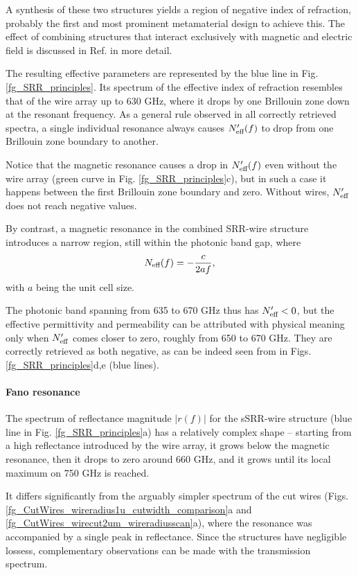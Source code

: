 A synthesis of these two structures yields a region of negative index of refraction, probably the first \cite{pendry2000negative} and most prominent metamaterial design to achieve this. The effect of combining structures that interact exclusively with magnetic and electric field is discussed in Ref. \cite{koschny2004effective} in more detail.

The resulting effective parameters are represented by the blue line in Fig. \ref{fg_SRR_principles}. Its spectrum of the effective index of refraction resembles that of the wire array up to 630 GHz, where it drops by one Brillouin zone down at the resonant frequency.
As a general rule observed in all correctly retrieved spectra, a single individual resonance always causes $N_{\text{eff} }'(f)$ to drop from one Brillouin zone boundary to another. 

Notice that the magnetic resonance causes a drop in $N_{\text{eff} }'(f)$ even without the wire array (green curve in Fig. \ref{fg_SRR_principles}c), but in such a case it happens between the first Brillouin zone boundary and zero. Without wires, $N_{\text{eff} }'$ does not reach negative values.

By contrast, a magnetic resonance in the combined SRR-wire structure introduces a narrow region, still within the photonic band gap, where 
\begin{equation} N_{\text{eff} }(f) = -\frac{c}{2 a f}, \label{eq_BZN2}\end{equation}
with $a$ being the unit cell size.	

The photonic band spanning from 635 to 670 GHz thus has $N_{\text{eff} }'<0$, but the effective permittivity and permeability can be attributed with physical meaning only when $N_{\text{eff} }'$ comes closer to zero, roughly from 650 to 670 GHz. They are correctly retrieved as both negative, as can be indeed seen from in Figs. \ref{fg_SRR_principles}d,e (blue lines).

\paragraph{Fano resonance} %
The spectrum of reflectance magnitude $|r(f)|$ for the sSRR-wire structure (blue line in Fig. \ref{fg_SRR_principles}a) has a relatively complex shape -- starting from a high reflectance introduced by the wire array, it grows below the magnetic resonance, then it drops to zero around 660 GHz, and it grows until its local maximum on 750 GHz is reached.

It differs significantly from the arguably simpler spectrum of the cut wires (Figs. \ref{fg_CutWires_wireradius1u_cutwidth_comparison}a and \ref{fg_CutWires_wirecut2um_wireradiusscan}a), where the resonance was accompanied by a single peak in reflectance. Since the structures have negligible lossess, complementary observations can be made with the transmission spectrum.

